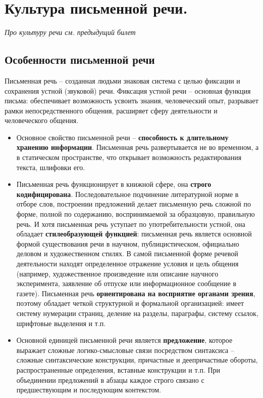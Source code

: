 \section{Культура письменной речи.}
    \textit{Про культуру речи см. предыдущий билет}

    \subsection*{Особенности письменной речи}
    Письменная речь – созданная людьми знаковая система с целью фиксации и сохранения устной (звуковой) речи. Фиксация устной речи – основная функция письма: обеспечивает возможность усвоить знания, человеческий опыт, разрывает рамки непосредственного общения, расширяет сферу деятельности и человеческого общения.

\begin{itemize}
    \item Основное свойство письменной речи – \textbf{способность к длительному хранению информации}. Письменная речь развертывается не во временном, а в статическом пространстве, что открывает возможность редактирования текста, шлифовки его.
    
    \item Письменная речь функционирует в книжной сфере, она \textbf{строго кодифицирована}. Последовательное подчинение литературной норме в отборе слов, построении предложений делает письменную речь сложной по форме, полной по содержанию, воспринимаемой за образцовую, правильную речь. И хотя письменная речь уступает по употребительности устной, она обладает \textbf{стилеобразующей функцией}: письменная речь является основной формой существования речи в научном, публицистическом, официально деловом и художественном стилях. В самой письменной форме речевой деятельности находят определенное отражение условия и цель общения (например, художественное произведение или описание научного эксперимента, заявление об отпуске или информационное сообщение в газете). Письменная речь \textbf{ориентирована на восприятие органами зрения}, поэтому обладает четкой структурной и формальной организацией: имеет систему нумерации страниц, деление на разделы, параграфы, систему ссылок, шрифтовые выделения и т.п.
    
    \item Основной единицей письменной речи является \textbf{предложение}, которое выражает сложные логико-смысловые связи посредством синтаксиса – сложные синтаксические конструкции, причастные и деепричастные обороты, распространенные определения, вставные конструкции и т.п. При объединении предложений в абзацы каждое строго связано с предшествующим и последующим контекстом.
\end{itemize}
